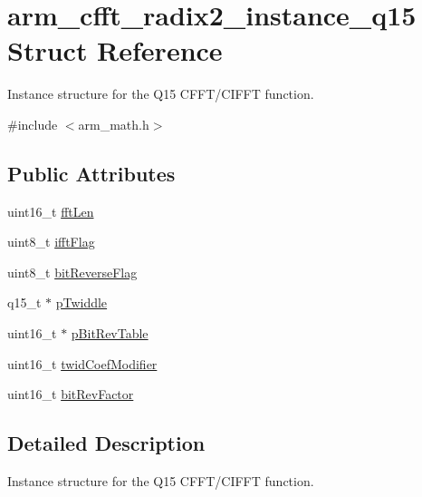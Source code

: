 \hypertarget{structarm__cfft__radix2__instance__q15}{\section{arm\-\_\-cfft\-\_\-radix2\-\_\-instance\-\_\-q15 Struct Reference}
\label{structarm__cfft__radix2__instance__q15}
}


Instance structure for the Q15 C\-F\-F\-T/\-C\-I\-F\-F\-T function.  




{\ttfamily \#include $<$arm\-\_\-math.\-h$>$}

\subsection*{Public Attributes}
\begin{DoxyCompactItemize}
\item 
uint16\-\_\-t \hyperlink{structarm__cfft__radix2__instance__q15_a874085647351dcf3f0de39d2b1d49744}{fft\-Len}
\item 
uint8\-\_\-t \hyperlink{structarm__cfft__radix2__instance__q15_ab5c073286bdd2f6e2bf783ced36bf1de}{ifft\-Flag}
\item 
uint8\-\_\-t \hyperlink{structarm__cfft__radix2__instance__q15_af8300c1f60caa21e6b44b9240ab5af19}{bit\-Reverse\-Flag}
\item 
q15\-\_\-t $\ast$ \hyperlink{structarm__cfft__radix2__instance__q15_a3809dd15e7cbf1a054c728cfbbb0cc5a}{p\-Twiddle}
\item 
uint16\-\_\-t $\ast$ \hyperlink{structarm__cfft__radix2__instance__q15_ab88afeff6493be3c8b5e4530efa82d51}{p\-Bit\-Rev\-Table}
\item 
uint16\-\_\-t \hyperlink{structarm__cfft__radix2__instance__q15_a6f2ab87fb4c568656e1f92f687b5c850}{twid\-Coef\-Modifier}
\item 
uint16\-\_\-t \hyperlink{structarm__cfft__radix2__instance__q15_a8722720c542cabd41df83fe88ef4f4cb}{bit\-Rev\-Factor}
\end{DoxyCompactItemize}


\subsection{Detailed Description}
Instance structure for the Q15 C\-F\-F\-T/\-C\-I\-F\-F\-T function. 

